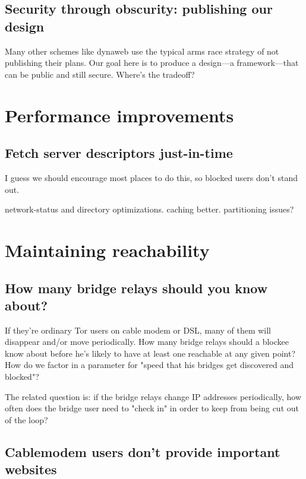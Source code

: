 \documentclass{llncs}
\begin{document}

\subsection{Security through obscurity: publishing our design}

Many other schemes like dynaweb use the typical arms race strategy of
not publishing their plans. Our goal here is to produce a design---a
framework---that can be public and still secure. Where's the tradeoff?

\section{Performance improvements}
\label{sec:performance}

\subsection{Fetch server descriptors just-in-time}

I guess we should encourage most places to do this, so blocked
users don't stand out.


network-status and directory optimizations. caching better. partitioning
issues?

\section{Maintaining reachability}

\subsection{How many bridge relays should you know about?}

If they're ordinary Tor users on cable modem or DSL, many of them will
disappear and/or move periodically. How many bridge relays should a
blockee know
about before he's likely to have at least one reachable at any given point?
How do we factor in a parameter for "speed that his bridges get discovered
and blocked"?

The related question is: if the bridge relays change IP addresses
periodically, how often does the bridge user need to "check in" in order
to keep from being cut out of the loop?

\subsection{Cablemodem users don't provide important websites}
\label{subsec:block-cable}
\end{document}
